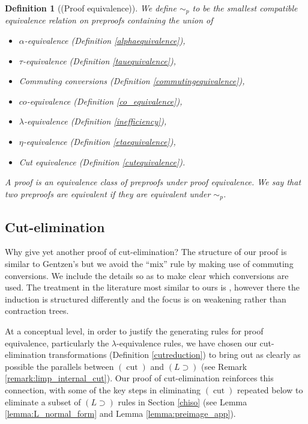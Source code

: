 \documentclass[english,letter paper,12pt,leqno]{article}
\theoremstyle{example}
\newtheorem{definition}[theorem]{Definition}
\numberwithin{equation}{section}
\def\imp{\supset}
\begin{document}
\begin{definition}[(Proof equivalence)]
We define $\sim_p$ to be the smallest compatible equivalence relation on preproofs containing the union of
\begin{itemize}
\item $\alpha$-equivalence (Definition \ref{alphaequivalence}),
\item $\tau$-equivalence (Definition \ref{tauequivalence}),
\item Commuting conversions (Definition \ref{commutingequivalence}),
\item $co$-equivalence (Definition \ref{co_equivalence}),
\item $\lambda$-equivalence (Definition \ref{inefficiency}),
\item $\eta$-equivalence (Definition \ref{etaequivalence}),
\item Cut equivalence (Definition \ref{cutequivalence}).
\end{itemize}
A \emph{proof} is an equivalence class of preproofs under proof equivalence. We say that two preproofs are \emph{equivalent} if they are equivalent under $\sim_p$.
\end{definition}

\subsection{Cut-elimination}

Why give yet another proof of cut-elimination? The structure of our proof is similar to Gentzen's \cite{gentzen} but we avoid the ``mix'' rule by making use of commuting conversions. We include the details so as to make clear which conversions are used. The treatment in the literature most similar to ours is \cite{cutctr}, however there the induction is structured differently and the focus is on weakening rather than contraction trees.

At a conceptual level, in order to justify the generating rules for proof equivalence, particularly the $\lambda$-equivalence rules, we have chosen our cut-elimination transformations (Definition \ref{cutreduction}) to bring out as clearly as possible the parallels between $(\operatorname{cut})$ and $(L \imp)$ (see Remark \ref{remark:limp_internal_cut}). Our proof of cut-elimination reinforces this connection, with some of the key steps in eliminating $(\operatorname{cut})$ repeated below to eliminate a subset of $(L \imp)$ rules in Section \ref{chiso} (see Lemma \ref{lemma:L_normal_form} and Lemma \ref{lemma:preimage_app}).
\end{document}
